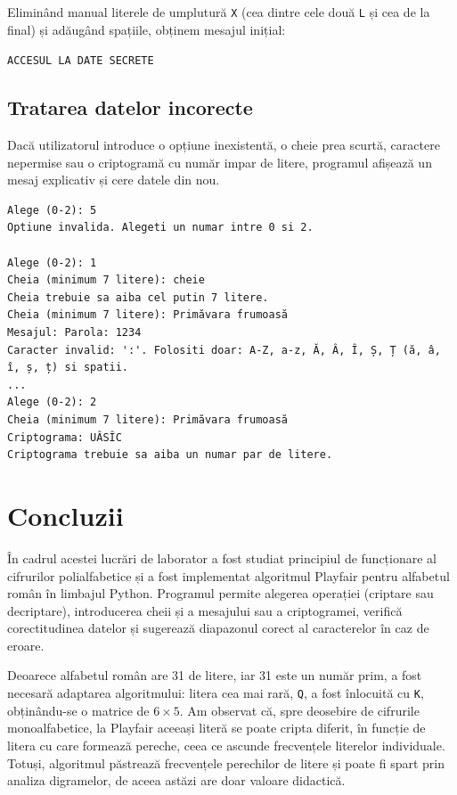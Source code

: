 \documentclass[12pt,a4paper]{article}
\begin{document}

Eliminând manual literele de umplutură \texttt{X} (cea dintre cele două
\texttt{L} și cea de la final) și adăugând spațiile, obținem mesajul inițial:
\begin{center}
\texttt{ACCESUL LA DATE SECRETE}
\end{center}

\subsection{Tratarea datelor incorecte}

Dacă utilizatorul introduce o opțiune inexistentă, o cheie prea scurtă, caractere
nepermise sau o criptogramă cu număr impar de litere, programul afișează un mesaj
explicativ și cere datele din nou.

\begin{lstlisting}[style=terminal, caption={Mesaje de eroare la introducerea datelor greșite}]
Alege (0-2): 5
Optiune invalida. Alegeti un numar intre 0 si 2.

Alege (0-2): 1
Cheia (minimum 7 litere): cheie
Cheia trebuie sa aiba cel putin 7 litere.
Cheia (minimum 7 litere): Primăvara frumoasă
Mesajul: Parola: 1234
Caracter invalid: ':'. Folositi doar: A-Z, a-z, Ă, Â, Î, Ș, Ț (ă, â, î, ș, ț) si spatii.
...
Alege (0-2): 2
Cheia (minimum 7 litere): Primăvara frumoasă
Criptograma: UÂSÎC
Criptograma trebuie sa aiba un numar par de litere.
\end{lstlisting}

\section{Concluzii}

În cadrul acestei lucrări de laborator a fost studiat principiul de funcționare al
cifrurilor polialfabetice și a fost implementat algoritmul Playfair pentru
alfabetul român în limbajul Python. Programul permite alegerea operației (criptare
sau decriptare), introducerea cheii și a mesajului sau a criptogramei, verifică
corectitudinea datelor și sugerează diapazonul corect al caracterelor în caz de
eroare.

Deoarece alfabetul român are 31 de litere, iar 31 este un număr prim, a fost
necesară adaptarea algoritmului: litera cea mai rară, \texttt{Q}, a fost înlocuită
cu \texttt{K}, obținându-se o matrice de $6 \times 5$. Am observat că, spre deosebire
de cifrurile monoalfabetice, la Playfair aceeași literă se poate cripta diferit, în
funcție de litera cu care formează pereche, ceea ce ascunde frecvențele literelor
individuale. Totuși, algoritmul păstrează frecvențele perechilor de litere și poate
fi spart prin analiza digramelor, de aceea astăzi are doar valoare didactică.
\end{document}
